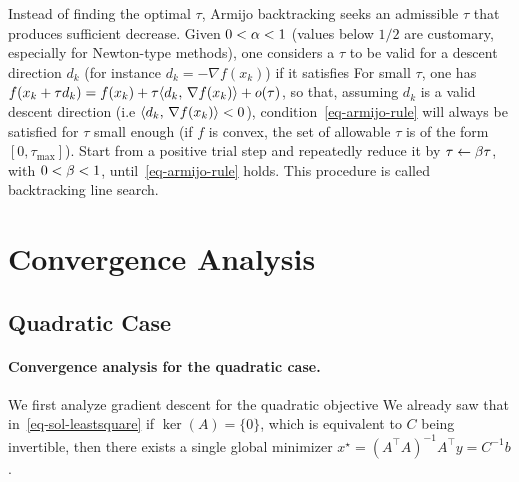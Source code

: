 \begin{rem}
	Instead of finding the optimal $\tau$, Armijo backtracking seeks an admissible $\tau$ that produces sufficient decrease.
	Given $0<\alpha<1$ (values below $1/2$ are customary, especially for Newton-type methods), one considers a $\tau$ to be valid for a descent direction $d_k$ (for instance $d_k=-\nabla f(x_k)$) if it satisfies
	For small $\tau$, one has $f(x_k+\tau d_k) = f(x_k)+\tau\langle d_k,\,\nabla f(x_k)\rangle+o(\tau)$, so that, assuming $d_k$ is a valid descent direction (i.e $\langle d_k,\,\nabla f(x_k)\rangle<0$),  condition~\eqref{eq-armijo-rule} will always be satisfied for $\tau$ small enough (if $f$ is convex, the set of allowable $\tau$ is of the form $[0,\tau_{\max}]$).
	Start from a positive trial step and repeatedly reduce it by $\tau\leftarrow\beta\tau$, with $0<\beta<1$, until~\eqref{eq-armijo-rule} holds.
	This procedure is called backtracking line search.
\end{rem}



\section{Convergence Analysis}


\subsection{Quadratic Case}

\paragraph{Convergence analysis for the quadratic case.}

We first analyze gradient descent for the quadratic objective
We already saw that in~\eqref{eq-sol-leastsquare} if $\ker(A)=\{0\}$, which is equivalent to $C$ being invertible, then there exists a single global minimizer $x^\star = (A^\top A)^{-1} A^\top y =C^{-1}b$.


